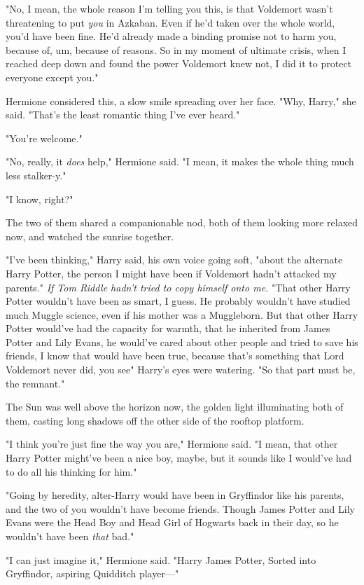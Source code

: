 "No, I mean, the whole reason I'm telling you this, is that Voldemort wasn't
threatening to put \emph{you} in Azkaban. Even if he'd taken over the whole
world, you'd have been fine. He'd already made a binding promise not to harm
you, because of, um, because of reasons. So in my moment of ultimate crisis,
when I reached deep down and found the power Voldemort knew not, I did it to
protect everyone except you."

Hermione considered this, a slow smile spreading over her face. "Why, Harry,"
she said. "That's the least romantic thing I've ever heard."

"You're welcome."

"No, really, it \emph{does} help," Hermione said. "I mean, it makes the whole
thing much less stalker-y."

"I know, right?"

The two of them shared a companionable nod, both of them looking more relaxed
now, and watched the sunrise together.

"I've been thinking," Harry said, his own voice going soft, "about the
alternate Harry Potter, the person I might have been if Voldemort hadn't
attacked my parents." \emph{If Tom Riddle hadn't tried to copy himself onto
me.} "That other Harry Potter wouldn't have been as smart, I guess. He probably
wouldn't have studied much Muggle science, even if his mother was a Muggleborn.
But that other Harry Potter would've had{\el} the capacity for warmth, that
he inherited from James Potter and Lily Evans, he would've cared about other
people and tried to save his friends, I know that would have been true, because
that's something that Lord Voldemort never did, you see{\el}" Harry's eyes
were watering. "So that part must be, the remnant."

The Sun was well above the horizon now, the golden light illuminating both of
them, casting long shadows off the other side of the rooftop platform.

"I think you're just fine the way you are," Hermione said. "I mean, that other
Harry Potter might've been a nice boy, maybe, but it sounds like I would've had
to do all his thinking for him."

"Going by heredity, alter-Harry would have been in Gryffindor like his parents,
and the two of you wouldn't have become friends. Though James Potter and Lily
Evans were the Head Boy and Head Girl of Hogwarts back in their day, so he
wouldn't have been \emph{that} bad."

"I can just imagine it," Hermione said. "Harry James Potter, Sorted into
Gryffindor, aspiring Quidditch player—"

